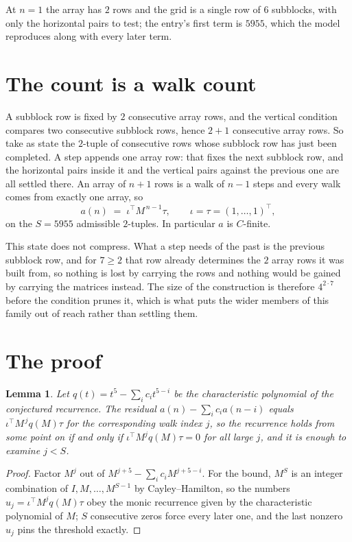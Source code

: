 \documentclass[11pt,a4paper]{article}
\theoremstyle{plain}
\newtheorem{lemma}[theorem]{Lemma}
\theoremstyle{definition}
\begin{document}
At $n=1$ the array has $2$ rows and the grid is a single row of $6$
subblocks, with only the horizontal pairs to test; the entry's first term is
$5955$, which the model reproduces along with every later term.

\section{The count is a walk count}

A subblock row is fixed by $2$ consecutive array rows, and the vertical condition compares
two consecutive subblock rows, hence $2+1$ consecutive array rows. So take as state the
$2$-tuple of consecutive rows whose subblock row has just been completed. A step appends one
array row: that fixes the next subblock row, and the horizontal pairs inside it and the
vertical pairs against the previous one are all settled there. An array of $n+1$ rows is
a walk of $n-1$ steps and every walk comes from exactly one array, so
\[
a(n)\;=\;\iota^{\!\top}M^{\,n-1}\tau,\qquad\iota=\tau=(1,\dots,1)^{\!\top},
\]
on the $S=5955$ admissible $2$-tuples. In particular $a$ is $C$-finite.

This state does not compress. What a step needs of the past is the previous subblock row, and
for $7\ge2$ that row already determines the $2$ array rows it was built from, so nothing
is lost by carrying the rows and nothing would be gained by carrying the matrices instead. The
size of the construction is therefore $4^{2\cdot7}$ before the condition prunes
it, which is what puts the wider members of this family out of reach rather than settling them.

\section{The proof}

\begin{lemma}\label{lem:crit}
Let $q(t)=t^{5}-\sum_i c_it^{5-i}$ be the characteristic polynomial of the
conjectured recurrence. The residual $a(n)-\sum_ic_ia(n-i)$ equals
$\iota^{\!\top}M^{\,j}q(M)\tau$ for the corresponding walk index $j$, so the recurrence
holds from some point on if and only if $\iota^{\!\top}M^{j}q(M)\tau=0$ for all large $j$,
and it is enough to examine $j<S$.
\end{lemma}

\begin{proof}
Factor $M^{j}$ out of $M^{j+5}-\sum_ic_iM^{j+5-i}$. For the bound, $M^{S}$
is an integer combination of $I,M,\dots,M^{S-1}$ by Cayley--Hamilton, so the numbers
$u_j=\iota^{\!\top}M^{j}q(M)\tau$ obey the monic recurrence given by the characteristic
polynomial of $M$; $S$ consecutive zeros force every later one, and the last nonzero $u_j$
pins the threshold exactly.
\end{proof}
\end{document}
